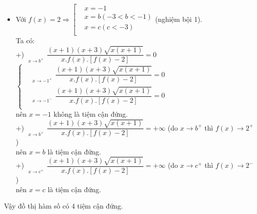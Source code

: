 \begin{ex}
{\begin{itemize}
			Ta có: $\underset{x\to -3^+}{\mathop{\lim \limits_{n \to +\infty}}}\,\dfrac{\left(x+1\right)\left(x+3\right)\sqrt{x\left(x+1\right)}}{x.f\left(x\right).\left[f\left(x\right)-2\right]}=-\infty$ nên $x=-3$ là tiệm cận đứng.
			\item Với $f\left(x \right)=2\Rightarrow\left[\begin{aligned}
				& x=-1 \\ 
				& x=b\left( -3<b<-1 \right) \\ 
				& x=c\left( c<-3 \right) \\ 
			\end{aligned}\right.$(nghiệm bội 1).\\
			Ta có:\\
			+) $\underset{x\to b^+}{\mathop{\lim \limits_{n \to +\infty}}}\,\dfrac{\left(x+1\right)\left(x+3 \right)\sqrt{x\left(x+1\right)}}{x.f\left(x\right).\left[f\left(x\right)-2\right]}=0$ $\left\{\begin{aligned}
				& \underset{x\to -1^+}{\mathop{\lim \limits_{n \to +\infty}}}\,\dfrac{\left(x+1\right)\left(x+3 \right)\sqrt{x\left(x+1 \right)}}{x.f\left(x \right).\left[ f\left(x \right)-2\right]}=0 \\ 
				& \underset{x\to -1^-}{\mathop{\lim \limits_{n \to +\infty}}}\,\dfrac{\left(x+1\right)\left(x+3\right)\sqrt{x\left(x+1\right)}}{x.f\left(x\right).\left[f\left(x \right)-2 \right]}=0 \\ 
			\end{aligned} \right.$ \\
			nên $x=-1$ không là tiệm cận đứng.\\
			+) $\underset{x\to b^+}{\mathop{\lim \limits_{n \to +\infty}}}\,\dfrac{\left(x+1 \right)\left(x+3 \right)\sqrt{x\left(x+1\right)}}{x.f\left(x \right).\left[f\left(x \right)-2 \right]}=+\infty $ (do $x\to b^+$ thì $f\left(x\right)\to 2^+$) \\
			nên $x=b$ là tiệm cận đứng.\\
			+) $\underset{x\to c^+}{\mathop{\lim \limits_{n \to +\infty}}}\,\dfrac{\left(x+1 \right)\left(x+3 \right)\sqrt{x\left(x+1 \right)}}{x.f\left( x \right).\left[f\left(x \right)-2 \right]}=+\infty $ (do $x\to c^+$ thì $f\left(x\right)\to 2^-$) \\
			nên $x=c$ là tiệm cận đứng.
		\end{itemize}
		Vậy đồ thị hàm số có $4$ tiệm cận đứng.}
\end{ex}
